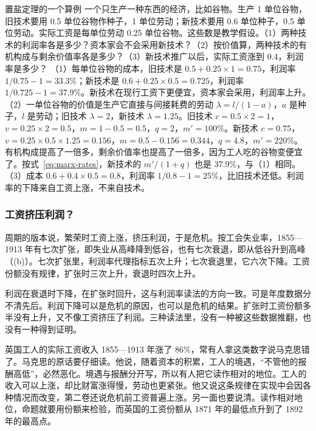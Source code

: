 \begin{example}{置盐定理的一个算例}\label{ex:marx-okishio}
一个只生产一种东西的经济，比如谷物。生产 1 单位谷物，旧技术要用 0.5 单位谷物作种子，1 单位劳动；新技术要用 0.6 单位种子，0.5 单位劳动。实际工资是每单位劳动 0.25 单位谷物。这些数是教学假设。（1）两种技术的利润率各是多少？资本家会不会采用新技术？（2）按价值算，两种技术的有机构成与剩余价值率各是多少？（3）新技术推广以后，实际工资涨到 0.4，利润率是多少？
\solution （1）每单位谷物的成本，旧技术是 $0.5+0.25\times1=0.75$，利润率 $1/0.75-1=33.3\%$；新技术是 $0.6+0.25\times0.5=0.725$，利润率 $1/0.725-1=37.9\%$。新技术在现行工资下更便宜，资本家会采用，利润率上升。（2）一单位谷物的价值是生产它直接与间接耗费的劳动 $\lambda=l/(1-a)$，$a$ 是种子，$l$ 是劳动；旧技术 $\lambda=2$，新技术 $\lambda=1.25$。旧技术 $c=0.5\times2=1$，$v=0.25\times2=0.5$，$m=1-0.5=0.5$，$q=2$，$m'=100\%$。新技术 $c=0.75$，$v=0.25\times0.5\times1.25=0.156$，$m=0.5-0.156=0.344$，$q=4.8$，$m'=220\%$。有机构成提高了一倍多，剩余价值率也提高了一倍多，因为工人吃的谷物变便宜了。按式~\eqref{eq:marx-rates}，新技术的 $m'/(1+q)$ 也是 37.9\%，与（1）相同。（3）成本 $0.6+0.4\times0.5=0.8$，利润率 $1/0.8-1=25\%$，比旧技术还低。利润率的下降来自工资上涨，不来自技术。
\end{example}

\subsubsection{工资挤压利润？}
周期的版本说，繁荣时工资上涨，挤压利润，于是危机。按工会失业率，1855—1913 年有七次扩张，即失业从高峰降到低谷，也有七次衰退，即从低谷升到高峰（(b)）。七次扩张里，利润率代理指标五次上升；七次衰退里，它六次下降。工资份额没有规律，扩张时三次上升，衰退时四次上升\cite{boe2017,mitchell1988}。

利润在衰退时下降，在扩张时回升，这与利润率读法的方向一致。可是年度数据分不清先后。利润下降可以是危机的原因，也可以是危机的结果。扩张时工资份额多半没有上升，又不像工资挤压了利润。三种读法里，没有一种被这些数据推翻，也没有一种得到证明。

\begin{pitfall}[马克思预言工人的实际工资会一直下降]
英国工人的实际工资收入 1855—1913 年涨了 86\%，常有人拿这类数字说马克思错了。马克思的原话要仔细读。他说，随着资本的积累，工人的境遇，“不管他的报酬高低”，必然恶化\cite{marx1887}。境遇与报酬分开写，所以有人把它读作相对的地位。工人的收入可以上涨，却比财富涨得慢，劳动也更紧张。他又说这条规律在实现中会因各种情况而改变，第二卷还说危机前工资普遍上涨\cite{marx1887,marx1909k2}。另一面也要说清。读作相对地位，命题就要用份额来检验，而英国的工资份额从 1871 年的最低点升到了 1892 年的最高点。
\end{pitfall}

